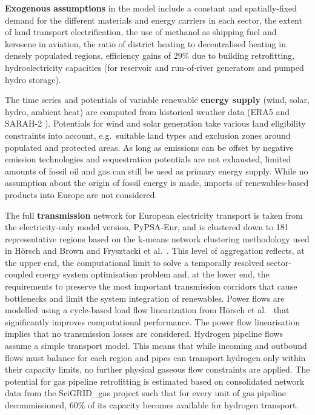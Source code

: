 \textbf{Exogenous assumptions} in the model include a constant and
spatially-fixed demand for the different materials and energy carriers in each
sector, the extent of land transport electrification, the use of methanol as
shipping fuel and kerosene in aviation, the ratio of district heating to
decentralised heating in densely populated regions, efficiency gains of 29\% due
to building retrofitting, hydroelectricity capacities (for reservoir and
run-of-river generators and pumped hydro storage).

The time series and potentials of variable renewable \textbf{energy supply}
(wind, solar, hydro, ambient heat) are computed from historical weather data
(ERA5 \cite{ecmwf} and SARAH-2 \cite{SARAH}). Potentials for wind and solar
generation take various land eligibility constraints into account, e.g.~suitable
land types and exclusion zones around populated and protected areas. As long as
emissions can be offset by negative emission technologies and sequestration
potentials are not exhausted, limited amounts of fossil oil and gas can still be
used as primary energy supply. While no assumption about the origin of fossil
energy is made, imports of renewables-based products into Europe are not
considered.

The full \textbf{transmission} network for European electricity transport is
taken from the electricity-only model version,
PyPSA-Eur,\cite{horschPyPSAEurOpen2018} and is clustered down to 181
representative regions based on the k-means network clustering methodology used
in Hörsch and Brown\cite{Hoersch2017} and Frysztacki et
al.~\cite{frysztackiStrongEffect2021}. This level of aggregation reflects, at
the upper end, the computational limit to solve a temporally resolved
sector-coupled energy system optimisation problem and, at the lower end, the
requirements to preserve the most important transmission corridors that cause
bottlenecks and limit the system integration of renewables.
Power flows are modelled using a cycle-based load flow linearization from Hörsch
et al.~\cite{horschLinearOptimal2018} that significantly improves computational
performance. The power flow linearisation implies that no transmission losses
are considered. Hydrogen pipeline flows assume a simple transport model. This
means that while incoming and outbound flows must balance for each region and
pipes can transport hydrogen only within their capacity limits, no further
physical gaseous flow constraints are applied. The potential for gas pipeline
retrofitting is estimated based on consolidated network data from the
SciGRID\_gas project \cite{plutaSciGRIDGas2022a} such that for every unit of gas
pipeline decommissioned, 60\% of its capacity becomes available for hydrogen
transport.\cite{gasforclimateEuropeanHydrogen2020}

